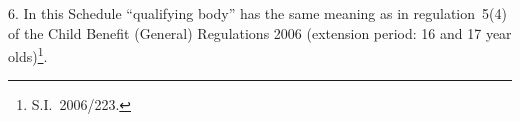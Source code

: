 \documentclass[a4paper,12pt]{article}
\begin{document}
%
%
%
%
%
%
%

6.  In this Schedule “qualifying body” has the same meaning as in regulation~5(4) of the Child Benefit (General) Regulations 2006 (extension period: 16 and 17 year olds)\footnote{S.I.~2006/223.}.

\end{document}
